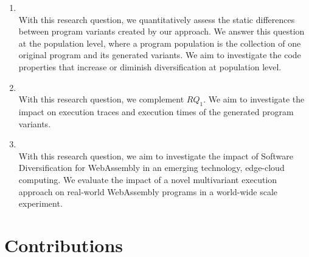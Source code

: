 \begin{enumerate}[label=\subscript{RQ}{{\arabic*}}]
    \item \textbf{\rqone}\\
    With this research question, we quantitatively assess the static differences between program variants created by our approach. We answer this question at the population level, where a program population is the collection of one original program and its generated variants. We aim to investigate the code properties that increase or diminish diversification at population level. 

    \item \textbf{\rqtwo} \\
    With this research question, we complement $RQ_1$. We aim to investigate the impact on execution traces and execution times of the generated program variants.

    \item \textbf{\rqthree} \\
    With this research question, we aim to investigate the impact of Software Diversification for WebAssembly in an emerging technology, edge-cloud computing. We evaluate the impact of a novel multivariant execution approach on real-world WebAssembly programs in a world-wide scale experiment.
    
    
\end{enumerate}


\renewcommand{\rqone}{$RQ_1$. To what extent can we artificially generate program variants for WebAssembly?}

\renewcommand{\rqtwo}{$RQ_2$. To what extent are the generated variants dynamically different?}
\renewcommand{\rqthree}{$RQ_3$. To what extent do the artificial variants exhibit different execution times on edge-cloud platforms?}

\section{Contributions}

